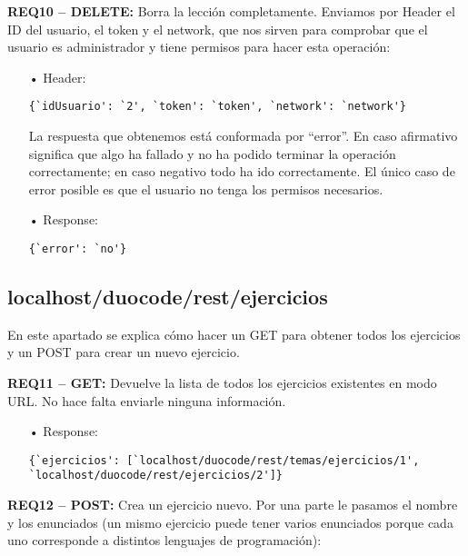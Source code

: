\textbf{REQ10 – DELETE:} Borra la lección completamente. Enviamos por Header el ID del usuario, el token y el network, que nos sirven para comprobar que el usuario es administrador y tiene permisos para hacer esta operación:
\begin{itemize}

\item[•]
Header: 
{\codesize
\begin{verbatim}
{`idUsuario': `2', `token': `token', `network': `network'}
\end{verbatim}
}

La respuesta que obtenemos está conformada por ``error''. En caso afirmativo significa que algo ha fallado y no ha podido terminar la operación correctamente; en caso negativo todo ha ido correctamente. El único caso de error posible es que el usuario no tenga los permisos necesarios.

\item[•] 
Response:
{\codesize
\begin{verbatim} 
{`error': `no'}
\end{verbatim}
}
\end{itemize}

\subsection{localhost/duocode/rest/ejercicios}
En este apartado se explica cómo hacer un GET para obtener todos los ejercicios y un POST para crear un nuevo ejercicio.
\vspace{1em}

\textbf{REQ11 – GET:} Devuelve la lista de todos los ejercicios existentes en modo URL. No hace falta enviarle ninguna información. 

\begin{itemize}
\item[•]
Response: 
{\codesize
\begin{verbatim}
{`ejercicios': [`localhost/duocode/rest/temas/ejercicios/1', 
`localhost/duocode/rest/ejercicios/2']}
\end{verbatim}
}
\end{itemize}

\textbf{REQ12 – POST:} Crea un ejercicio nuevo. Por una parte le pasamos el nombre y los enunciados (un mismo ejercicio puede tener varios enunciados porque cada uno corresponde a distintos lenguajes de programación):

